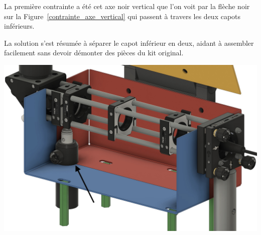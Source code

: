 \begin{minipage}[c]{0.4\textwidth}
    La première contrainte a été cet axe noir vertical que l'on voit par la flèche noir sur la Figure~\ref{contrainte_axe_vertical} qui passent à travers les deux capots inférieurs.

    La solution s'est résumée à séparer le capot inférieur en deux, aidant à assembler facilement sans devoir démonter des pièces du kit original.
\end{minipage}\hfill
\begin{minipage}[c]{0.58\textwidth}
    \begin{center}
        \includegraphics[width=\textwidth]{assets/figures/Protections_laser/Securite_mecanique/Protection_entree_laser/contrainte_axe_vertical.jpeg}
    \end{center}
    \label{contrainte_axe_vertical}
\end{minipage}

